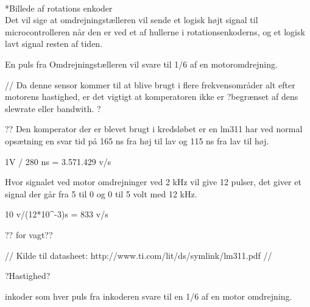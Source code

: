 \\
*Billede af rotations enkoder
\\

Det vil sige at omdrejningstælleren vil sende et logisk højt signal til microcontrolleren når den er ved et af hullerne i  rotationsenkoderns, og et logisk lavt signal resten af tiden.

En puls fra Omdrejningstælleren vil svare til 1/6 af en motoromdrejning.

//
Da denne sensor kommer til at blive brugt i flere frekvensområder alt efter motorens hastighed, er det vigtigt at komperatoren ikke er ?begrænset af dens slewrate eller bandwith. ? 


??
Den komperator der er blevet brugt i kredsløbet er en lm311 har ved normal opsætning en svar tid på 165 ns fra høj til lav og 115 ns fra lav til høj.

1V / 280 ns = 3.571.429 v/s

Hvor signalet ved motor omdrejninger ved 2 kHz vil give 12 pulser, det giver et signal der går fra 5 til 0 og 0 til 5 volt med 12 kHz.

10 v/(12*10^-3)s = 833 v/s

?? for vagt?? 


//
Kilde til datasheet: http://www.ti.com/lit/ds/symlink/lm311.pdf
//

?Hastighed?

inkoder som hver puls fra inkoderen svare til en 1/6 af en motor omdrejning. 
